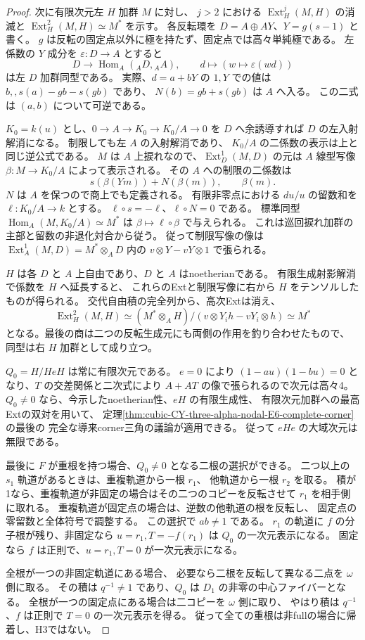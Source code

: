 \begin{proof}
次に有限次元左 $H$ 加群 $M$ に対し、
$j>2$ における $\operatorname{Ext}^{j}_H(M,H)$ の消滅と
$\operatorname{Ext}^2_H(M,H)\simeq M^*$ を示す。
各反転環を $D=A\oplus AY$、$Y=g(s-1)$ と書く。
$g$ は反転の固定点以外に極を持たず、固定点では高々単純極である。
左係数の $Y$ 成分を $\varepsilon:D\to A$ とすると
\[
 D\longrightarrow \operatorname{Hom}_A({}_A D,{}_A A),
 \qquad d\longmapsto (w\mapsto\varepsilon(wd))
\]
は左 $D$ 加群同型である。
実際、$d=a+bY$ の $1,Y$ での値は
$b,,s(a)-g b-s(g b)$ であり、
$N(b)=g b+s(g b)$ は $A$ へ入る。
この二式は $(a,b)$ について可逆である。

$K_0=k(u)$ とし、$0\to A\to K_0\to K_0/A\to0$ を
$D$ へ余誘導すれば $D$ の左入射解消になる。
制限しても左 $A$ の入射解消であり、
$K_0/A$ の二係数の表示は上と同じ逆公式である。
$M$ は $A$ 上捩れなので、$\operatorname{Ext}^1_D(M,D)$ の元は
$A$ 線型写像 $\beta:M\to K_0/A$ によって表示される。
その $A$ への制限の二係数は
\[
 s(\beta(Ym))+N(\beta(m)),\qquad \beta(m).
\]
$N$ は $A$ を保つので商上でも定義される。
有限非零点における $du/u$ の留数和を $\ell:K_0/A\to k$ とする。
$\ell\circ s=-\ell$、$\ell\circ N=0$ である。
標準同型 $\operatorname{Hom}_A(M,K_0/A)\simeq M^*$ は
$\beta\mapsto\ell\circ\beta$ で与えられる。
これは巡回捩れ加群の主部と留数の非退化対合から従う。
従って制限写像の像は
$\operatorname{Ext}^1_A(M,D)=M^*\otimes_A D$ 内の
$v\otimes Y-vY\otimes1$ で張られる。

$H$ は各 $D$ と $A$ 上自由であり、$D$ と $A$ はnoetherianである。
有限生成射影解消で係数を $H$ へ延長すると、
これらのExtと制限写像に右から $H$ をテンソルしたものが得られる。
交代自由積の完全列から、高次Extは消え、
\[
 \operatorname{Ext}^2_H(M,H)
 \simeq
 (M^*\otimes_A H)/(v\otimes Y_i h-vY_i\otimes h)
 \simeq M^*
\]
となる。最後の商は二つの反転生成元にも両側の作用を釣り合わせたもので、
同型は右 $H$ 加群として成り立つ。

$Q_0=H/HeH$ は常に有限次元である。
$e=0$ により $(1-au)(1-bu)=0$ となり、$T$ の交差関係と二次式により
$A+AT$ の像で張られるので次元は高々4。
$Q_0\ne0$ なら、今示したnoetherian性、$eH$ の有限生成性、
有限次元加群への最高Extの双対を用いて、
定理\ref{thm:cubic-CY-three-alpha-nodal-E6-complete-corner}の最後の
完全な導来corner三角の議論が適用できる。
従って $eHe$ の大域次元は無限である。

最後に $F$ が重根を持つ場合、$Q_0\ne0$ となる二根の選択ができる。
二つ以上の $s_1$ 軌道があるときは、重複軌道から一根 $r_1$、
他軌道から一根 $r_2$ を取る。
積が1なら、重複軌道が非固定の場合はその二つのコピーを反転させて
$r_1$ を相手側に取れる。
重複軌道が固定点の場合は、逆数の他軌道の根を反転し、
固定点の零留数と全体符号で調整する。
この選択で $ab\ne1$ である。
$r_1$ の軌道に $f$ の分子根が残り、非固定なら
$u=r_1,T=-f(r_1)$ は $Q_0$ の一次元表示になる。
固定なら $f$ は正則で、$u=r_1,T=0$ が一次元表示になる。

全根が一つの非固定軌道にある場合、
必要なら二根を反転して異なる二点を $\omega$ 側に取る。
その積は $q^{-1}\ne1$ であり、$Q_0$ は $D_1$ の非零の中心ファイバーとなる。
全根が一つの固定点にある場合は二コピーを $\omega$ 側に取り、
やはり積は $q^{-1}$、$f$ は正則で $T=0$ の一次元表示を得る。
従って全ての重根は非fullの場合に帰着し、H3ではない。
\end{proof}
